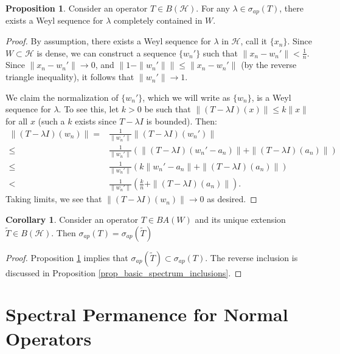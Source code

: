 \documentclass{dcthesis}
\numberwithin{equation}{section}
\numberwithin{equation}{section}
\theoremstyle{definition}
\newtheorem{proposition}[equation]{Proposition}
\newtheorem{corollary}[equation]{Corollary}
\begin{document}
\begin{proposition}
\label{prop_weyl_sequence_in_dense}
	Consider an operator $T\in B(\mathcal{H})$. For any $\lambda\in\sigma_{ap}(T)$, there exists a Weyl sequence for $\lambda$ completely contained in $W$.
\end{proposition}
\begin{proof}
	By assumption, there exists a Weyl sequence for $\lambda$ in $\mathcal{H}$, call it $\{x_n\}$. Since $W\subset\mathcal{H}$ is dense, we can construct a sequence $\{w_n'\}$ such that $\|x_n-w_n'\|<\frac{1}{n}$. Since $\|x_n-w_n'\|\to 0$, and $\|1-\|w_n'\|\|\leq\|x_n-w_n'\|$ (by the reverse triangle inequality), it follows that $\|w_n'\|\to 1$.

	We claim the normalization of $\{w_n'\}$, which we will write as $\{w_n\}$, is a Weyl sequence for $\lambda$. To see this, let $k>0$ be such that $\|(T-\lambda I)(x)\|\leq k\|x\|$ for all $x$ (such a $k$ exists since $T-\lambda I$ is bounded). Then:
	\begin{align*}
		\|(T-\lambda I)(w_n)\| =& \frac{1}{\|w_n'\|}\|(T-\lambda I)(w_n')\| \\
		\leq& \frac{1}{\|w_n'\|}(\|(T-\lambda I)(w_n' - a_n)\| + \|(T-\lambda I)(a_n)\|) \\
		\leq&  \frac{1}{\|w_n'\|}(k\|w_n'-a_n\| + \|(T-\lambda I)(a_n)\|) \\
		<& \frac{1}{\|w_n'\|}\left(\frac{k}{n}+\|(T-\lambda I)(a_n)\|\right).	
	\end{align*}
	Taking limits, we see that $\|(T-\lambda I)(w_n)\| \to 0$ as desired.
\end{proof}

\begin{corollary}
\label{cor_approximate_same}
	Consider an operator $T\in BA(W)$ and its unique extension $\tilde{T}\in B(\mathcal{H})$. Then $\sigma_{ap}(T)=\sigma_{ap}(\tilde{T})$
\end{corollary}
\begin{proof}
	Proposition \ref{prop_weyl_sequence_in_dense} implies that $\sigma_{ap}(\tilde{T})\subset\sigma_{ap}(T)$. The reverse inclusion is discussed in Proposition \ref{prop_basic_spectrum_inclusions}.
\end{proof}


\section{Spectral Permanence for Normal Operators} %
\end{document}
